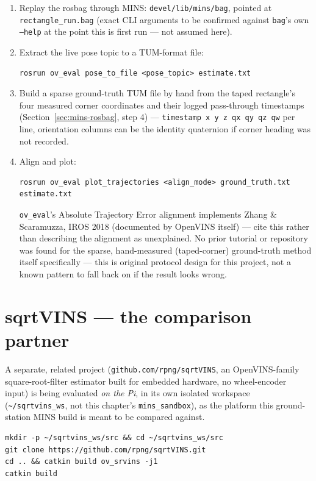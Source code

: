 \documentclass[11pt]{report}
\begin{document}
\begin{enumerate}
  \item Replay the rosbag through MINS: \texttt{devel/lib/mins/bag}, pointed
  at \texttt{rectangle\_run.bag} (exact CLI arguments to be confirmed
  against \texttt{bag}'s own \texttt{--help} at the point this is first
  run --- not assumed here).
  \item Extract the live pose topic to a TUM-format file:
\begin{lstlisting}[style=shell]
rosrun ov_eval pose_to_file <pose_topic> estimate.txt
\end{lstlisting}
  \item Build a sparse ground-truth TUM file by hand from the taped
  rectangle's four measured corner coordinates and their logged
  pass-through timestamps (Section~\ref{sec:mins-rosbag}, step 4) ---
  \texttt{timestamp x y z qx qy qz qw} per line, orientation columns can be
  the identity quaternion if corner heading was not recorded.
  \item Align and plot:
\begin{lstlisting}[style=shell]
rosrun ov_eval plot_trajectories <align_mode> ground_truth.txt estimate.txt
\end{lstlisting}
  \texttt{ov\_eval}'s Absolute Trajectory Error alignment implements Zhang
  \& Scaramuzza, IROS 2018 (documented by OpenVINS itself) --- cite this
  rather than describing the alignment as unexplained. No prior tutorial or
  repository was found for the sparse, hand-measured (taped-corner)
  ground-truth method itself specifically --- this is original protocol
  design for this project, not a known pattern to fall back on if the
  result looks wrong.
\end{enumerate}

\section{sqrtVINS --- the comparison partner}

A separate, related project (\texttt{github.com/rpng/sqrtVINS}, an
OpenVINS-family square-root-filter estimator built for embedded hardware,
no wheel-encoder input) is being evaluated \emph{on the Pi}, in its own
isolated workspace (\texttt{\textasciitilde/sqrtvins\_ws}, not this chapter's
\texttt{mins\_sandbox}), as the platform this ground-station MINS build is
meant to be compared against.

\begin{lstlisting}[style=shell]
mkdir -p ~/sqrtvins_ws/src && cd ~/sqrtvins_ws/src
git clone https://github.com/rpng/sqrtVINS.git
cd .. && catkin build ov_srvins -j1
catkin build
\end{lstlisting}
\end{document}
